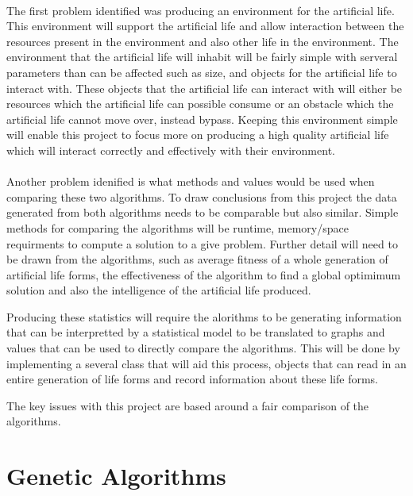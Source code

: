 \documentclass[12pt]{article}
\begin{document}
\paragraph{}
The first problem identified was producing an environment for the artificial life. This environment will support the artificial life and allow interaction between the resources present
in the environment and also other life in the environment. The environment that the artificial life will inhabit will be fairly simple with serveral parameters than can be affected such as
size, and objects for the artificial life to interact with. These objects that the artificial life can interact with will either be resources which the artificial life can possible consume
or an obstacle which the artificial life cannot move over, instead bypass. Keeping this environment simple will enable this project to focus more on producing a high quality artificial life
which will interact correctly and effectively with their environment. 

\paragraph{}
Another problem idenified is what methods and values would be used when comparing these two algorithms. To draw conclusions from this project the data generated from both algorithms needs 
to be comparable but also similar. Simple methods for comparing the algorithms will be runtime, memory/space requirments to compute a solution to a give problem. Further detail will need to
be drawn from the algorithms, such as average fitness of a whole generation of artificial life forms, the effectiveness of the algorithm to find a global optimimum solution and also the
intelligence of the artificial life produced. 

Producing these statistics will require the alorithms to be generating information that can be interpretted by a statistical model to be translated to graphs and values that can be
used to directly compare the algorithms. This will be done by implementing a several class that will aid this process, objects that can read in an entire generation of life forms
and record information about these life forms. 


The key issues with this project are based around a fair comparison of the algorithms. 

\section{Genetic Algorithms}
\end{document}
